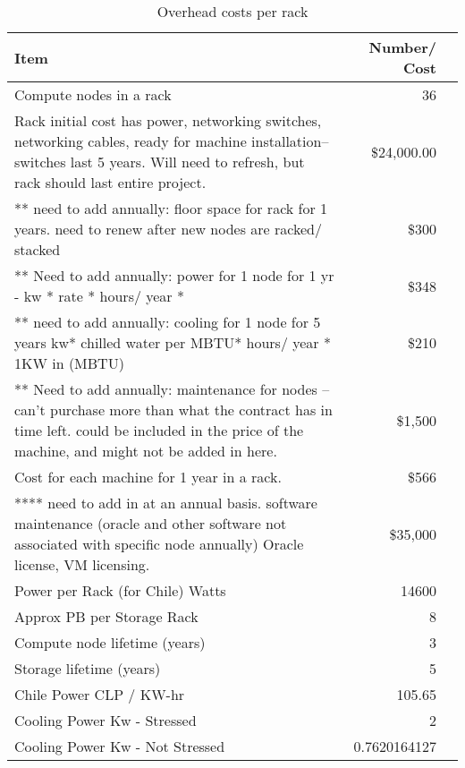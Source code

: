 \tiny \begin{longtable} { |p{}  |r  |r |} 
\caption{Overhead costs per rack \label{tab:overheads}}\\ 
\hline 
\textbf{Item}&\textbf{Number/ Cost} \\ \hline
{Compute nodes in a rack }&{36} \\ \hline
{Rack initial cost has power, networking switches, networking cables, ready for machine installation-- switches last 5 years.  Will need to refresh, but rack should last entire project.  }&{\$24,000.00} \\ \hline
{ ** need to add annually: floor space for rack for 1 years.   need to renew after new nodes are racked/ stacked }&{\$300} \\ \hline
{** Need to add annually: power for 1 node for 1 yr - kw * rate * hours/ year * }&{\$348} \\ \hline
{** need to add annually: cooling for 1 node for 5 years  kw* chilled water per MBTU* hours/ year *  1KW in (MBTU) }&{\$210} \\ \hline
{** Need to add annually: maintenance for nodes -- can't purchase more than what the contract has in time left.  could be included in the price of the machine, and might not be added in here.  }&{\$1,500} \\ \hline
{Cost for each machine for 1 year in a rack.   }&{\$566} \\ \hline
{**** need to add in at an annual basis.  software maintenance (oracle and other software not associated with specific node annually)  Oracle license, VM licensing.  }&{\$35,000} \\ \hline
{Power per Rack (for Chile) Watts}&{14600} \\ \hline
{Approx PB per Storage Rack }&{8} \\ \hline
{Compute node lifetime (years)}&{3} \\ \hline
{Storage lifetime (years)}&{5} \\ \hline
{Chile Power CLP /  KW-hr
}&{105.65} \\ \hline
{Cooling Power Kw - Stressed}&{2} \\ \hline
{Cooling Power Kw - Not Stressed}&{0.7620164127} \\ \hline
\end{longtable} \normalsize
